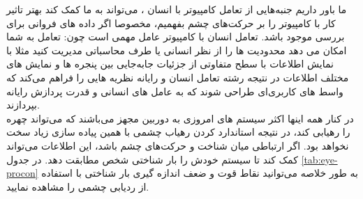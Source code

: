 ما باور داریم جنبه‌هایی از تعامل کامپیوتر با انسان
، می‌تواند به ما کمک کند بهتر تاثیر کار با کامپیوتر را بر  حرکت‌های چشم بفهمیم، مخصوصا اگر داده های فروانی برای بررسی موجود باشد.
تعامل انسان با کامپیوتر عامل مهمی است چون: تعامل به شما امکان می دهد محدودیت ها را از نظر انسانی یا طرف محاسباتی مدیریت کنید مثلا با نمایش اطلاعات با سطح متفاوتی از جزئیات جابه‌جایی بین پنجره ها و نمایش های مختلف اطلاعات در نتیجه رشته تعامل انسان و رایانه نظریه هایی را فراهم می‌کند که واسط های کاربری‌ای طراحی شوند که به عامل های انسانی و قدرت پردازش رایانه بپردازند.
\\
در کنار همه اینها اکثر سیستم های امروزی به دوربین مجهز می‌باشند که می‌تواند چهره را رهیابی کند، در نتیجه استاندارد کردن رهیاب چشمی با همین پیاده سازی زیاد سخت نخواهد بود. اگر ارتباطی میان شناخت و حرکت‌های چشم باشد،‌ این اطلاعات می‌تواند کمک کند تا سیستم خودش را بار شناختی شخص مطابقت دهد.
در جدول 
\ref{tab:eye-procon}
به طور خلاصه می‌توانید نقاط قوت و ضعف اندازه گیری بار شناختی با استفاده از ردیابی چشمی را مشاهده نمایید.

